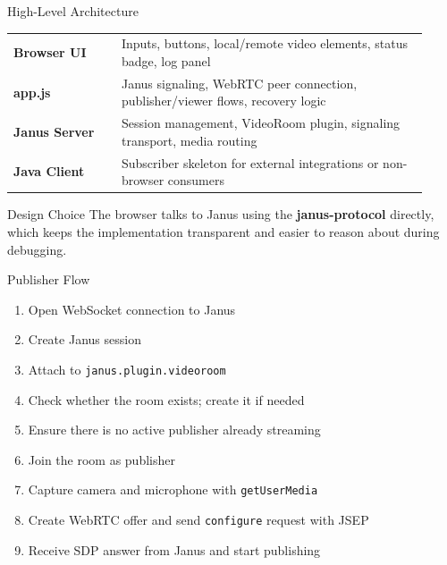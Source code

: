 \documentclass[aspectratio=169]{beamer}
\begin{document}
\begin{frame}{High-Level Architecture}
  \begin{center}
    \renewcommand{\arraystretch}{1.4}
    \begin{tabular}{>{\bfseries}m{0.24\linewidth} m{0.68\linewidth}}
      Browser UI & Inputs, buttons, local/remote video elements, status badge, log panel \\
      \addlinespace
      app.js & Janus signaling, WebRTC peer connection, publisher/viewer flows, recovery logic \\
      \addlinespace
      Janus Server & Session management, VideoRoom plugin, signaling transport, media routing \\
      \addlinespace
      Java Client & Subscriber skeleton for external integrations or non-browser consumers \\
    \end{tabular}
  \end{center}

  \vspace{0.6em}
  \begin{block}{Design Choice}
    The browser talks to Janus using the \textbf{janus-protocol} directly, which keeps the implementation transparent and easier to reason about during debugging.
  \end{block}
\end{frame}

\begin{frame}{Publisher Flow}
  \begin{enumerate}
    \item Open WebSocket connection to Janus
    \item Create Janus session
    \item Attach to \texttt{janus.plugin.videoroom}
    \item Check whether the room exists; create it if needed
    \item Ensure there is no active publisher already streaming
    \item Join the room as publisher
    \item Capture camera and microphone with \texttt{getUserMedia}
    \item Create WebRTC offer and send \texttt{configure} request with JSEP
    \item Receive SDP answer from Janus and start publishing
  \end{enumerate}
\end{frame}
\end{document}
